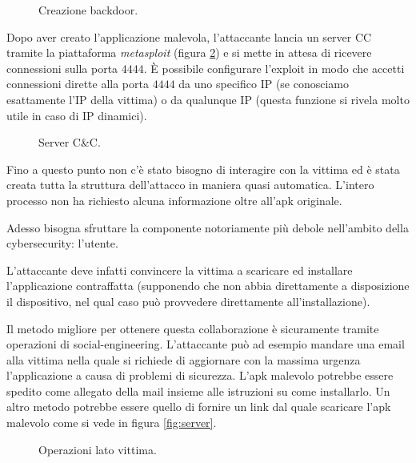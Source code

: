 \begin{figure}[h]
	\centering
	\caption{Creazione backdoor.}
	\label{fig:backdoor} 
\end{figure}

Dopo aver creato l'applicazione malevola, l'attaccante lancia un server \ac{CC} tramite la piattaforma \emph{metasploit} (figura \ref{fig:metasploit}) e si mette in attesa di ricevere connessioni sulla porta $4444$. È possibile configurare l'exploit in modo che accetti connessioni dirette alla porta $4444$ da uno specifico IP (se conosciamo esattamente l'IP della vittima) o da qualunque IP (questa funzione si rivela molto utile in caso di IP dinamici).

\begin{figure}[h]
	\centering
	\caption{Server C\&C.}
	\label{fig:metasploit} 
\end{figure}

Fino a questo punto non c'è stato bisogno di interagire con la vittima ed è stata creata tutta la struttura dell'attacco in maniera quasi automatica. L'intero processo non ha richiesto alcuna informazione oltre all'apk originale.

Adesso bisogna sfruttare la componente notoriamente più debole nell'ambito della cybersecurity: l'utente.

L'attaccante deve infatti convincere la vittima a scaricare ed installare l'applicazione contraffatta (supponendo che non abbia direttamente a disposizione il dispositivo, nel qual caso può provvedere direttamente all'installazione).

Il metodo migliore per ottenere questa collaborazione è sicuramente tramite operazioni di social-engineering. L'attaccante può ad esempio mandare una email alla vittima nella quale si richiede di aggiornare con la massima urgenza l'applicazione a causa di problemi di sicurezza. L'apk malevolo potrebbe essere spedito come allegato della mail insieme alle istruzioni su come installarlo. Un altro metodo potrebbe essere quello di fornire un link dal quale scaricare l'apk malevolo come si vede in figura \ref{fig:server}.

\begin{figure}[h]
	\centering
	\caption{Operazioni lato vittima.}
\end{figure}

